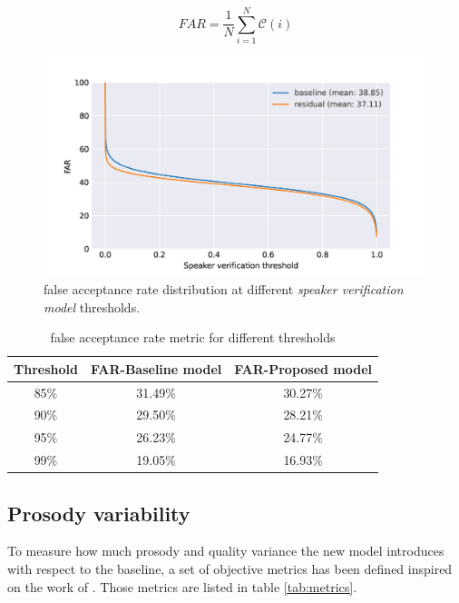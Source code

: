\begin{equation}
    FAR = \frac{1}{N}\sum_{i=1}^{N} \mathcal{C}(i)
    \label{eq:far}
\end{equation}


\begin{figure}[h]
	\centering
	\includegraphics[width=.7\linewidth]{tts/images/far}
	\caption{false acceptance rate distribution at different \textit{speaker verification model} thresholds.}
	\label{fig:far}
\end{figure}

\begin{table}[h]
	\centering
	\caption{false acceptance rate metric for different thresholds}
	\footnotesize
	\begin{tabular}{ccc}
		\toprule
		\textbf{Threshold} & \textbf{FAR-Baseline model} & \textbf{FAR-Proposed model} \\
		\midrule
		85\% & 31.49\% & 30.27\% \\

		90\% & 29.50\% & 28.21\% \\

		95\% & 26.23\% & 24.77\% \\

		99\% & 19.05\% & 16.93\% \\
		\bottomrule
	\end{tabular}
	\label{tab:far}
\end{table}



\subsection{Prosody variability}
To measure how much prosody and quality variance the new model introduces with respect to the baseline, a set of objective metrics has been defined inspired on the work of \autocite{Raitio2020}. Those metrics are listed in table \ref{tab:metrics}.

